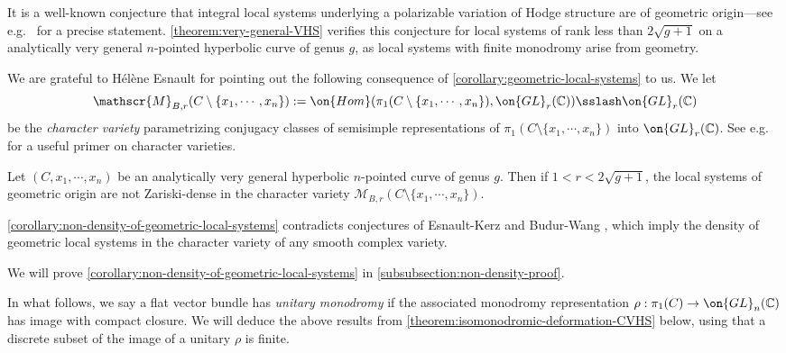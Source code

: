 \begin{remark}
\notready
    It is a well-known conjecture that integral local systems underlying a polarizable variation of Hodge structure are of geometric origin---see e.g.~\cite[Conjecture 12.4]{simpson62hodge} for a precise statement. \autoref{theorem:very-general-VHS} verifies this conjecture for local systems of rank less than $2\sqrt{g+1}$ on a analytically very general $n$-pointed hyperbolic curve of genus $g$, as local systems with finite monodromy arise from geometry.
\end{remark}

We are grateful to H\'el\`ene Esnault for pointing out the following consequence of \autoref{corollary:geometric-local-systems} to us. We let $$\mathscr{M}_{B,r}(C\setminus \{x_1, \cdots, x_n\}):=\on{Hom}(\pi_1(C\setminus\{x_1, \cdots, x_n\}), \on{GL}_r(\mathbb{C}))\sslash \on{GL}_r(\mathbb{C})$$ be the \emph{character variety} parametrizing conjugacy classes of semisimple representations of $\pi_1(C\setminus \{x_1, \cdots, x_n\})$ into $\on{GL}_r(\mathbb{C})$. See e.g.~\cite{sikora2012character} for a useful primer on character varieties.
\begin{corollary}
\notready
    \label{corollary:non-density-of-geometric-local-systems}
    Let $(C, x_1, \cdots, x_n)$ be an analytically very general hyperbolic $n$-pointed curve of genus $g$. Then if $1<r<2\sqrt{g+1}$, the local systems of geometric origin are not Zariski-dense in the character variety $\mathscr{M}_{B,r}(C\setminus \{x_1, \cdots, x_n\})$.
\end{corollary}

\begin{remark}
\notready
     \autoref{corollary:non-density-of-geometric-local-systems} contradicts conjectures of Esnault-Kerz \cite[Conjecture 1.1]{esnault2021local} and Budur-Wang \cite[Conjecture 10.3.1]{budur2020absolute}, which imply the density of geometric local systems in the character variety of any smooth complex variety.
\end{remark}



We will prove \autoref{corollary:non-density-of-geometric-local-systems} in
\autoref{subsubsection:non-density-proof}.

In what follows, we say a flat vector bundle has \emph{unitary monodromy} if the associated monodromy representation
$\rho:\pi_1(C)\to \on{GL}_n(\mathbb{C})$
has image with compact closure.
We will deduce the above results from
\autoref{theorem:isomonodromic-deformation-CVHS} below,
using that a discrete subset of the image of a unitary $\rho$ is finite.

